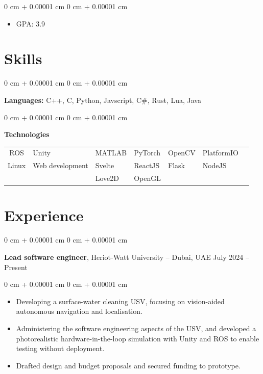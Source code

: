 \documentclass[10pt, letterpaper]{article}
\newenvironment{highlights}{
    \begin{itemize}[
        topsep=0.10 cm,
        parsep=0.10 cm,
        partopsep=0pt,
        itemsep=0pt,
        leftmargin=0 cm + 10pt
    ]
}{
    \end{itemize}
} %
\newenvironment{onecolentry}{
    \begin{adjustwidth}{
        0 cm + 0.00001 cm
    }{
        0 cm + 0.00001 cm
    }
}{
    \end{adjustwidth}
} %
\newenvironment{twocolentry}[2][]{
    \onecolentry
    \def\secondColumn{#2}
    \setcolumnwidth{\fill, 4.5 cm}
    \begin{paracol}{2}
}{
    \switchcolumn \raggedleft \secondColumn
    \end{paracol}
    \endonecolentry
} %
\begin{document}
        \vspace{0.10 cm}
        \begin{onecolentry}
            \begin{highlights}
                \item GPA: 3.9
            \end{highlights}
        \end{onecolentry}


    \section{Skills}

        \begin{onecolentry}
            \textbf{Languages:} C++, C, Python, Javscript, C\#, Rust, Lua, Java
        \end{onecolentry}

        \vspace{0.2 cm}

        \begin{onecolentry}
        \textbf{Technologies}
        \begin{tabularx}{\textwidth}{c *{6}{Y}}
            ROS & Unity & MATLAB & PyTorch & OpenCV & PlatformIO \\ Linux & Web development & Svelte & ReactJS & Flask & NodeJS \\ & & Love2D & OpenGL
        \end{tabularx}
    \end{onecolentry}

    
    \section{Experience}

        \begin{twocolentry}{
            July 2024 – Present
        }
        \textbf{Lead software engineer}, Heriot-Watt University -- Dubai, UAE\end{twocolentry}

        \vspace{0.10 cm}
        \begin{onecolentry}
            \begin{highlights}
                \item Developing a surface-water cleaning USV, focusing on vision-aided autonomous navigation and localisation.
                \item Administering the software engineering aspects of the USV, and developed a photorealistic hardware-in-the-loop simulation with Unity and ROS to enable testing without deployment.
                \item Drafted design and budget proposals and secured funding to prototype.
            \end{highlights}
        \end{onecolentry}
\end{document}
